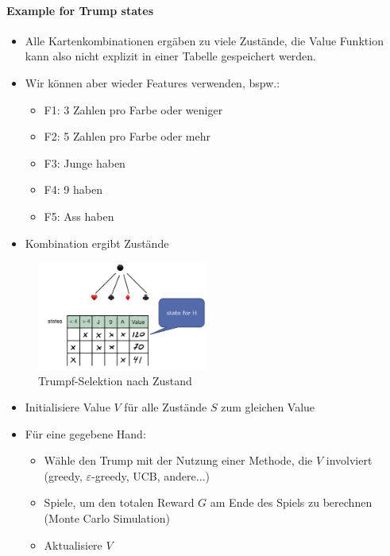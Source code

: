 \documentclass[a4paper]{article}
\begin{document}
		\paragraph{Example for Trump states}
		
		\begin{itemize}
			\item Alle Kartenkombinationen ergäben zu viele Zustände, die Value Funktion kann also nicht explizit in einer Tabelle gespeichert werden.
			\item Wir können aber wieder Features verwenden, bspw.:
				\begin{itemize}
					\item F1: 3 Zahlen pro Farbe oder weniger
					\item F2: 5 Zahlen pro Farbe oder mehr
					\item F3: Junge haben
					\item F4: 9 haben
					\item F5: Ass haben
				\end{itemize}
			\item Kombination ergibt Zustände
		\end{itemize}
		
		\begin{figure}[htb!]
			\centering
			\includegraphics[width=0.5\textwidth]{img/08_reinforcement_learning/trump_select.png}
			\caption{Trumpf-Selektion nach Zustand}
		\end{figure}
	
		\begin{itemize}
			\item Initialisiere Value $V$ für alle Zustände $S$ zum gleichen Value
			\item Für eine gegebene Hand:
				\begin{itemize}
					\item Wähle den Trump mit der Nutzung einer Methode, die $V$ involviert (greedy, $\varepsilon$-greedy, UCB, andere...)
					\item Spiele, um den totalen Reward $G$ am Ende des Spiels zu berechnen (Monte Carlo Simulation)
					\item Aktualisiere $V$
				\end{itemize}
		\end{itemize}
		
\end{document}
